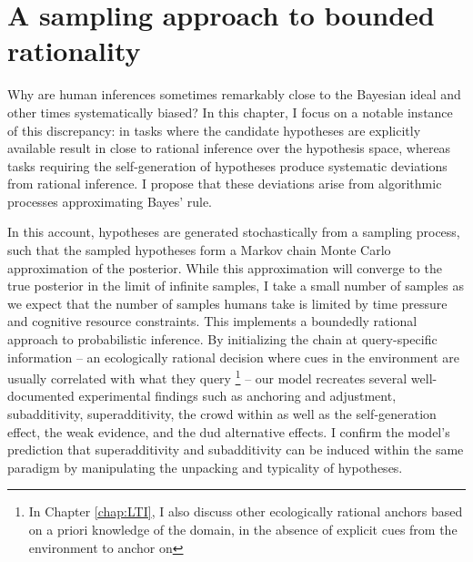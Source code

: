 



\chapter{A sampling approach to bounded rationality}
\label{chap:MCMC}


Why are human inferences sometimes remarkably close to the Bayesian ideal and other times systematically biased? In this chapter, I focus on a notable instance of this discrepancy: in tasks where the candidate hypotheses are explicitly available result in close to rational inference over the hypothesis space, whereas tasks requiring the self-generation of hypotheses produce systematic deviations from rational inference. I propose that these deviations arise from algorithmic processes approximating Bayes’ rule. 

In this account, hypotheses are generated stochastically from a sampling process, such that the sampled hypotheses form a Markov chain Monte Carlo approximation of the posterior. While this approximation will converge to the true posterior in the limit of infinite samples, I take a small number of samples as we expect that the number of samples humans take is limited by time pressure and cognitive resource constraints. This implements a boundedly rational approach to probabilistic inference. By initializing the chain at query-specific information -- an ecologically rational decision where cues in the environment are usually correlated with what they query \footnote{In Chapter \ref{chap:LTI}, I also discuss other ecologically rational anchors based on a priori knowledge of the domain, in the absence of explicit cues from the environment to anchor on} -- our model recreates several well-documented experimental findings such as anchoring and adjustment, subadditivity, superadditivity, the crowd within as well as the self-generation effect, the weak evidence, and the dud alternative effects. I confirm the model’s prediction that superadditivity and subadditivity can be induced within the same paradigm by manipulating the unpacking and typicality of hypotheses. 

